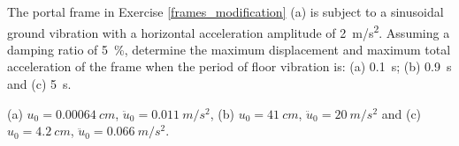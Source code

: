 
\begin{Exercise}[label={frame_ground_acceleration}]
The portal frame in Exercise \ref{frames_modification} (a) is subject to a sinusoidal ground vibration with a horizontal acceleration amplitude of \SI{2}{m/s^2}. Assuming a damping ratio of \SI{5}{\%}, determine the maximum displacement and maximum total acceleration of the frame when the period of floor vibration is: (a) \SI{0.1}{s}; (b) \SI{0.9}{s} and (c) \SI{5}{s}.

\begin{center}
\end{center}

\shortAnswer (a) $u_0 = \SI{0.00064}{cm}$, $\ddot{u}_0 = \SI{0.011}{m/s^2}$, (b) $u_0 = \SI{41}{cm}$, $\ddot{u}_0 = \SI{20}{m/s^2}$ and (c) $u_0 = \SI{4.2}{cm}$, $\ddot{u}_0 = \SI{0.066}{m/s^2}$.
\end{Exercise}




